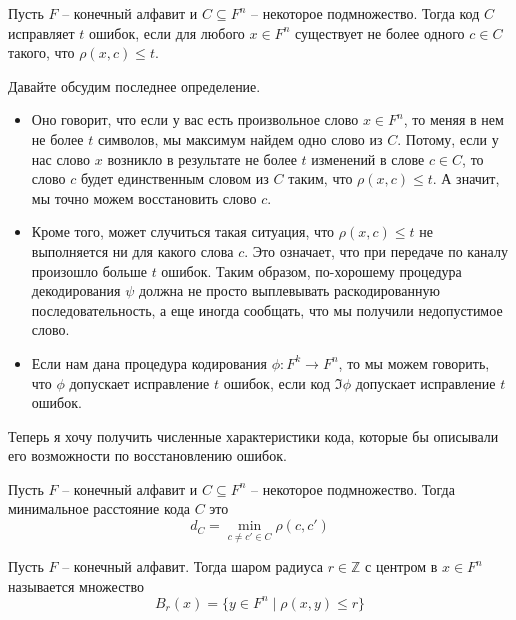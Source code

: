 \begin{definition}
\label{def::CodeCorrectsTMist}
Пусть $F$ -- конечный алфавит и $C\subseteq F^n$ -- некоторое подмножество.
Тогда код $C$ исправляет $t$ ошибок, если для любого $x\in F^n$ существует не более одного $c\in C$ такого, что $\rho(x, c) \leqslant t$.
\end{definition}

Давайте обсудим последнее определение.
\begin{itemize}
\item
Оно говорит, что если у вас есть произвольное слово $x\in F^n$, то меняя в нем не более $t$ символов, мы максимум найдем одно слово из $C$.
Потому, если у нас слово $x$ возникло в результате не более $t$ изменений в слове $c\in C$, то слово $c$ будет единственным словом из $C$ таким, что $\rho(x, c) \leqslant t$.
А значит, мы точно можем восстановить слово $c$.

\item Кроме того, может случиться такая ситуация, что $\rho(x, c) \leqslant t$ не выполняется ни для какого слова $c$.
Это означает, что при передаче по каналу произошло больше $t$ ошибок.
Таким образом, по-хорошему процедура декодирования $\psi$ должна не просто выплевывать раскодированную последовательность, а еще иногда сообщать, что мы получили недопустимое слово.

\item Если нам дана процедура кодирования $\phi\colon F^k \to F^n$, то мы можем говорить, что $\phi$ допускает исправление $t$ ошибок, если код $\Im \phi$ допускает исправление $t$ ошибок.
\end{itemize}

Теперь я хочу получить численные характеристики кода, которые бы описывали его возможности по восстановлению ошибок.

\begin{definition}
\label{def::CodeMinDist}
Пусть $F$ -- конечный алфавит и $C\subseteq F^n$ -- некоторое подмножество.
Тогда минимальное расстояние кода $C$ это
\[
d_C = \min_{c\neq c' \in C} \rho(c, c')
\]
\end{definition}

\begin{definition}
\label{def::CodeBall}
Пусть $F$ -- конечный алфавит.
Тогда шаром радиуса $r\in \mathbb Z$ с центром в $x\in F^n$ называется множество
\[
B_r(x) = \{y\in F^n \mid \rho(x, y) \leqslant r\}
\]
\end{definition}

